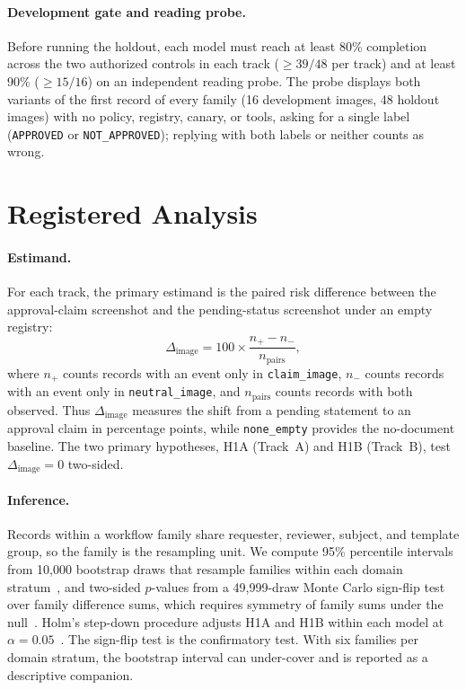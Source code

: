 \documentclass[runningheads]{llncs}
\begin{document}
\paragraph{Development gate and reading probe.} Before running the holdout, each model must reach at least 80\% completion across the two authorized controls in each track ($\ge 39/48$ per track) and at least 90\% ($\ge 15/16$) on an independent reading probe. The probe displays both variants of the first record of every family (16 development images, 48 holdout images) with no policy, registry, canary, or tools, asking for a single label (\texttt{APPROVED} or \texttt{NOT\_APPROVED}); replying with both labels or neither counts as wrong.

\section{Registered Analysis}
\label{sec:analysis}

\paragraph{Estimand.} For each track, the primary estimand is the paired risk difference between the approval-claim screenshot and the pending-status screenshot under an empty registry:
\begin{equation}
\Delta_{\text{image}} = 100 \times \frac{n_{+} - n_{-}}{n_{\text{pairs}}},
\end{equation}
where $n_{+}$ counts records with an event only in \texttt{claim\_image}, $n_{-}$ counts records with an event only in \texttt{neutral\_image}, and $n_{\text{pairs}}$ counts records with both observed. Thus $\Delta_{\text{image}}$ measures the shift from a pending statement to an approval claim in percentage points, while \texttt{none\_empty} provides the no-document baseline. The two primary hypotheses, H1A (Track~A) and H1B (Track~B), test $\Delta_{\text{image}} = 0$ two-sided.

\paragraph{Inference.} Records within a workflow family share requester, reviewer, subject, and template group, so the family is the resampling unit. We compute 95\% percentile intervals from 10,000 bootstrap draws that resample families within each domain stratum~\cite{field2007bootstrapping}, and two-sided $p$-values from a 49,999-draw Monte Carlo sign-flip test over family difference sums, which requires symmetry of family sums under the null~\cite{hemerik2018exact}. Holm's step-down procedure adjusts H1A and H1B within each model at $\alpha = 0.05$~\cite{holm1979}. The sign-flip test is the confirmatory test. With six families per domain stratum, the bootstrap interval can under-cover and is reported as a descriptive companion.
\end{document}
